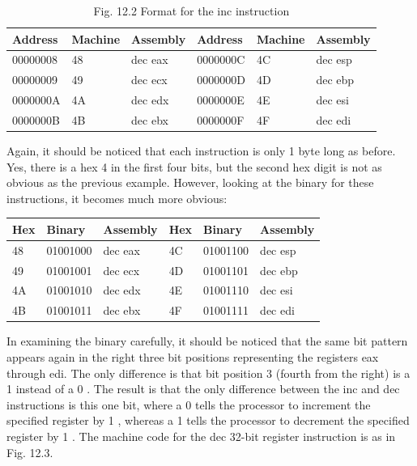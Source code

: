 \documentclass[10pt]{article}
\begin{document}
\begin{table}[h]
\begin{center}
\captionsetup{labelformat=empty}
\caption{Fig. 12.2 Format for the inc instruction}
\begin{tabular}{|l|l|l|l|l|l|}
\hline
Address & Machine & Assembly & Address & Machine & Assembly \\
\hline
00000008 & 48 & dec eax & 0000000C & 4C & dec esp \\
\hline
00000009 & 49 & dec ecx & 0000000D & 4D & dec ebp \\
\hline
0000000A & 4A & dec edx & 0000000E & 4E & dec esi \\
\hline
0000000B & 4B & dec ebx & 0000000F & 4F & dec edi \\
\hline
\end{tabular}
\end{center}
\end{table}

Again, it should be noticed that each instruction is only 1 byte long as before. Yes, there is a hex 4 in the first four bits, but the second hex digit is not as obvious as the previous example. However, looking at the binary for these instructions, it becomes much more obvious:

\begin{center}
\begin{tabular}{|l|l|l|l|l|l|}
\hline
Hex & Binary & Assembly & Hex & Binary & Assembly \\
\hline
48 & 01001000 & dec eax & 4C & 01001100 & dec esp \\
\hline
49 & 01001001 & dec ecx & 4D & 01001101 & dec ebp \\
\hline
4A & 01001010 & dec edx & 4E & 01001110 & dec esi \\
\hline
4B & 01001011 & dec ebx & 4F & 01001111 & dec edi \\
\hline
\end{tabular}
\end{center}

In examining the binary carefully, it should be noticed that the same bit pattern appears again in the right three bit positions representing the registers eax through edi. The only difference is that bit position 3 (fourth from the right) is a 1 instead of a 0 . The result is that the only difference between the inc and dec instructions is this one bit, where a 0 tells the processor to increment the specified register by 1 , whereas a 1 tells the processor to decrement the specified register by 1 . The machine code for the dec 32-bit register instruction is as in Fig. 12.3.
\end{document}
